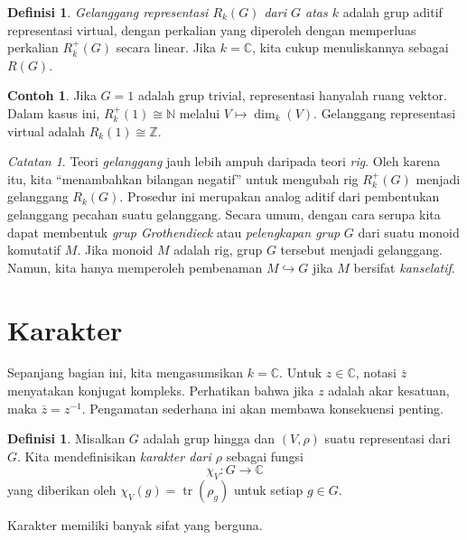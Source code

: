 \documentclass[12pt]{article}
\theoremstyle{plain}
\theoremstyle{definition}
\newtheorem{definition}[theorem]{Definisi}
\newtheorem{example}[theorem]{Contoh}
\theoremstyle{remark}
\newtheorem{remark}[theorem]{Catatan}
\numberwithin{equation}{section}
\begin{document}
\begin{definition}
\emph{Gelanggang representasi $R_k(G)$ dari $G$ atas $k$} adalah
grup aditif representasi virtual, dengan perkalian yang
diperoleh dengan memperluas perkalian $R^+_k(G)$ secara linear.
Jika $k=\mathbb{C}$, kita cukup menuliskannya sebagai $R(G)$.
\end{definition}

\begin{example}
Jika $G=1$ adalah grup trivial, representasi hanyalah ruang vektor.
Dalam kasus ini, $R^+_k(1) \cong \mathbb{N}$ melalui $V \mapsto \dim_k(V)$.
Gelanggang representasi virtual adalah $R_k(1) \cong \mathbb{Z}$.
\end{example}

\begin{remark}
Teori \emph{gelanggang} jauh lebih ampuh daripada teori \emph{rig}.
Oleh karena itu, kita ``menambahkan bilangan negatif'' untuk mengubah rig $R^+_k(G)$
menjadi gelanggang $R_k(G)$.
Prosedur ini merupakan analog aditif dari pembentukan gelanggang pecahan suatu gelanggang.
Secara umum, dengan cara serupa kita dapat membentuk \emph{grup Grothendieck}
atau \emph{pelengkapan grup} $G$ dari suatu monoid komutatif $M$.
Jika monoid $M$ adalah rig, grup $G$ tersebut menjadi gelanggang.
Namun, kita hanya memperoleh pembenaman $M \hookrightarrow G$ jika
$M$ bersifat \emph{kanselatif}.
\end{remark}

\section{Karakter}

Sepanjang bagian ini, kita mengasumsikan $k=\mathbb{C}$.
Untuk $z \in \mathbb{C}$, notasi $\overline{z}$ menyatakan
konjugat kompleks. Perhatikan bahwa jika $z$ adalah akar kesatuan, maka
$\overline{z}=z^{-1}$. Pengamatan sederhana ini akan membawa konsekuensi
penting.

\begin{definition}
Misalkan $G$ adalah grup hingga dan $(V,\rho)$ suatu representasi dari $G$.
Kita mendefinisikan \emph{karakter dari $\rho$} sebagai fungsi
\[
\chi_V : G \to \mathbb{C}
\]
yang diberikan oleh $\chi_V(g)=\operatorname{tr}(\rho_g)$ untuk setiap $g \in G$.
\end{definition}

Karakter memiliki banyak sifat yang berguna.
\end{document}
